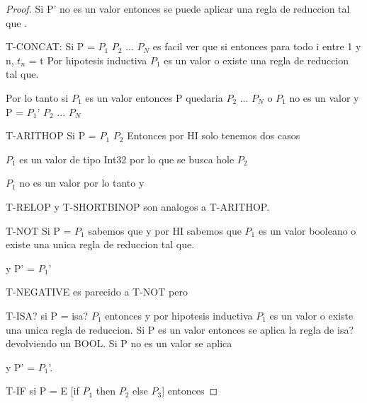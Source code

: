 \begin{proof}
Si P' no es un valor entonces se puede aplicar una regla de reduccion tal que
  \fullarrow {}.

T-CONCAT: Si P = $P_{1}$ $P_{2}$ ... $P_{N}$ es facil ver que si
entonces  para todo i entre 1 y n, $t_{n}$ = t
 Por hipotesis inductiva $P_{1}$ es un valor o existe
una regla de reduccion tal que.

 \fullarrow {}

Por lo tanto si $P_{1}$ es un valor entonces P quedaria $P_{2}$ ... $P_{N}$
o $P_{1}$ no es un valor y P = $P_{1}$' $P_{2}$ ... $P_{N}$

T-ARITHOP Si P = $P_{1}$  $P_{2}$ Entonces por HI solo tenemos dos casos
 
$P_{1}$ es un valor de tipo Int32 por lo que se busca hole $P_{2}$

$P_{1}$ no es un valor por lo tanto  \fullarrow {}
y  \fullarrow {}

T-RELOP y T-SHORTBINOP son analogos a T-ARITHOP.

T-NOT Si P =  $P_{1}$ sabemos que  y por HI
sabemos que $P_{1}$ es un valor booleano o existe una unica regla de reduccion tal que.

 \fullarrow {}

y P' =  $P_{1}$'

T-NEGATIVE es parecido a T-NOT pero 

T-ISA? si P = isa?  $P_{1}$ entonces 
y por hipotesis inductiva $P_{1}$ es un valor o existe una unica regla de reduccion.
Si P es un valor entonces se aplica la regla de isa? devolviendo un BOOL.
Si P no es un valor se aplica 

 \fullarrow {}

y P' =   $P_{1}$'.

T-IF si P = E [if $P_{1}$ then $P_{2}$ else $P_{3}$] entonces 

\end{proof}

